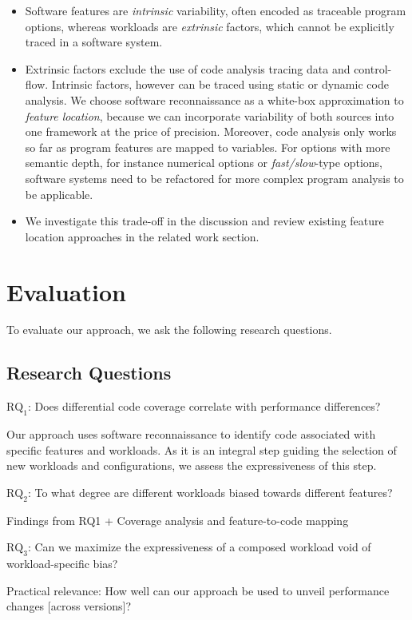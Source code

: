 \documentclass[conference]{IEEEtran}
\newcommand{\greybox}[1]{
	\begin{mdframed}[backgroundcolor=black!10!white,linewidth=0pt,backgroundcolor=black!10,linewidth=0pt,innerleftmargin=5pt,innertopmargin=5pt]
		#1
	\end{mdframed}
}
\begin{document}
\begin{itemize}
	\item Software features are \emph{intrinsic} variability, often encoded as traceable program options, whereas workloads are \emph{extrinsic} factors, which cannot be explicitly traced in a software system.
	\item Extrinsic factors exclude the use of code analysis tracing data and control-flow. Intrinsic factors, however can be traced using static or dynamic code analysis. 
	We choose software reconnaissance as a white-box approximation to \emph{feature location}, because we can incorporate variability of both sources into one framework at the price of precision. Moreover, code analysis only works so far as program features are mapped to variables. For options with more semantic depth, for instance numerical options or \emph{fast/slow}-type options, software systems need to be refactored for more complex program analysis to be applicable.
	\item We investigate this trade-off in the discussion and review existing feature location approaches in the related work section.
\end{itemize}

\section{Evaluation}
To evaluate our approach, we ask the following research questions.

\subsection{Research Questions}
\greybox{\textbf{$\text{RQ}_1$}: Does differential code coverage correlate with performance differences?}
Our approach uses software reconnaissance to identify code associated with specific features and workloads. As it is an integral step guiding the selection of new workloads and configurations, we assess the expressiveness of this step.
 
\greybox{\textbf{$\text{RQ}_2$}: To what degree are different workloads biased towards different features?}
Findings from RQ1 + Coverage analysis and feature-to-code mapping

\greybox{\textbf{$\text{RQ}_3$}: Can we maximize the expressiveness of a composed workload void of workload-specific bias?}
Practical relevance: How well can our approach be used to unveil performance changes [across versions]?
 
\end{document}
